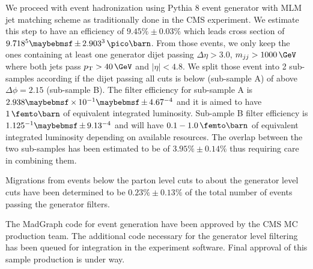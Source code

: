We proceed with event hadronization using Pythia 8 event generator with MLM jet matching scheme as traditionally done in the \gls{CMS} experiment. We estimate this step to have an efficiency of $9.45\% \pm 0.03\%$ which leads cross section of $9.718 \time 10^5 \pm 2.903 \time 10^3\,\pico\barn$. From those events, we only keep the ones containing at least one generator dijet passing $\Delta\eta > 3.0$, $m_{jj} > 1000\,\GeV$ where both jets pass $\pt > 40\,\GeV$ and $|\eta|<4.8$. We split those event into 2 sub-samples according if the dijet passing all cuts is below (sub-sample A) of above $\Delta\phi=2.15$ (sub-sample B). The filter efficiency for sub-sample A is $2.938 \times 10^{-1} \pm 4.67 \time 10^{-4}$ and it is aimed to have $1\,\femto\barn$ of equivalent integrated luminosity. Sub-ample B filter efficiency is $1.125 \time 10^{-1} \pm 9.13 \time 10^{-4}$ and will have $0.1-1.0\,\femto\barn$ of equivalent integrated luminosity depending on available resources. The overlap between the two sub-samples has been estimated to be of $3.95\% \pm 0.14\%$ thus requiring care in combining them.

Migrations from events below the parton level cuts to about the generator level cuts have been determined to be $0.23\% \pm 0.13\%$ of the total number of events passing the generator filters.

The MadGraph code for event generation have been approved by the \gls{CMS} \gls{MC} production team. The additional code necessary for the generator level filtering has been queued for integration in the experiment software. Final approval of this sample production is under way. 

